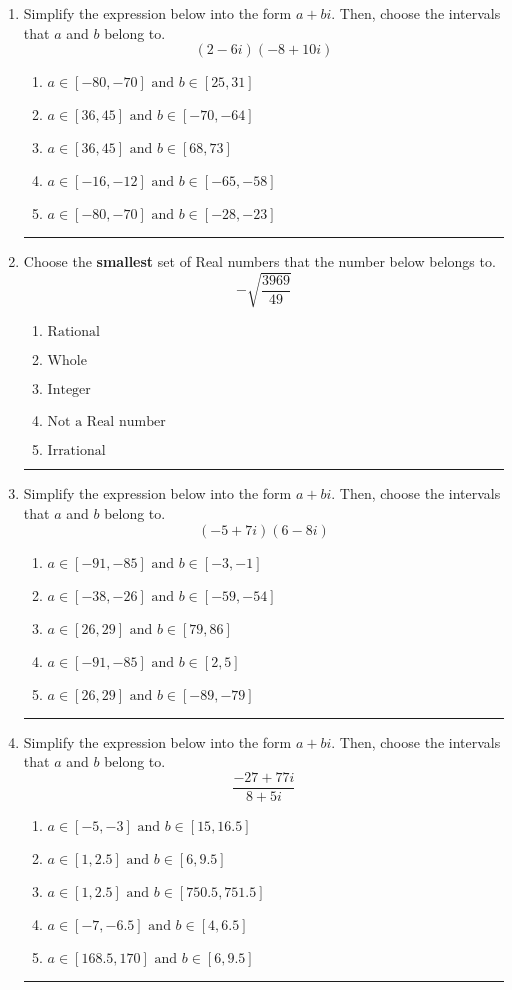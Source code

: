 \documentclass[14pt]{extbook}
\newcommand{\litem}[1]{\item#1\hspace*{-1cm}\rule{\textwidth}{0.4pt}}
\begin{document}
\begin{enumerate}
{\begin{enumerate}[label=\Alph*.]
\end{enumerate} }
\litem{
Simplify the expression below into the form $a+bi$. Then, choose the intervals that $a$ and $b$ belong to.\[ (2 - 6 i)(-8 + 10 i) \]\begin{enumerate}[label=\Alph*.]
\item \( a \in [-80, -70] \text{ and } b \in [25, 31] \)
\item \( a \in [36, 45] \text{ and } b \in [-70, -64] \)
\item \( a \in [36, 45] \text{ and } b \in [68, 73] \)
\item \( a \in [-16, -12] \text{ and } b \in [-65, -58] \)
\item \( a \in [-80, -70] \text{ and } b \in [-28, -23] \)

\end{enumerate} }
\litem{
Choose the \textbf{smallest} set of Real numbers that the number below belongs to.\[ -\sqrt{\frac{3969}{49}} \]\begin{enumerate}[label=\Alph*.]
\item \( \text{Rational} \)
\item \( \text{Whole} \)
\item \( \text{Integer} \)
\item \( \text{Not a Real number} \)
\item \( \text{Irrational} \)

\end{enumerate} }
\litem{
Simplify the expression below into the form $a+bi$. Then, choose the intervals that $a$ and $b$ belong to.\[ (-5 + 7 i)(6 - 8 i) \]\begin{enumerate}[label=\Alph*.]
\item \( a \in [-91, -85] \text{ and } b \in [-3, -1] \)
\item \( a \in [-38, -26] \text{ and } b \in [-59, -54] \)
\item \( a \in [26, 29] \text{ and } b \in [79, 86] \)
\item \( a \in [-91, -85] \text{ and } b \in [2, 5] \)
\item \( a \in [26, 29] \text{ and } b \in [-89, -79] \)

\end{enumerate} }
\litem{
Simplify the expression below into the form $a+bi$. Then, choose the intervals that $a$ and $b$ belong to.\[ \frac{-27 + 77 i}{8 + 5 i} \]\begin{enumerate}[label=\Alph*.]
\item \( a \in [-5, -3] \text{ and } b \in [15, 16.5] \)
\item \( a \in [1, 2.5] \text{ and } b \in [6, 9.5] \)
\item \( a \in [1, 2.5] \text{ and } b \in [750.5, 751.5] \)
\item \( a \in [-7, -6.5] \text{ and } b \in [4, 6.5] \)
\item \( a \in [168.5, 170] \text{ and } b \in [6, 9.5] \)


\end{enumerate}}
\end{enumerate}
\end{document}
